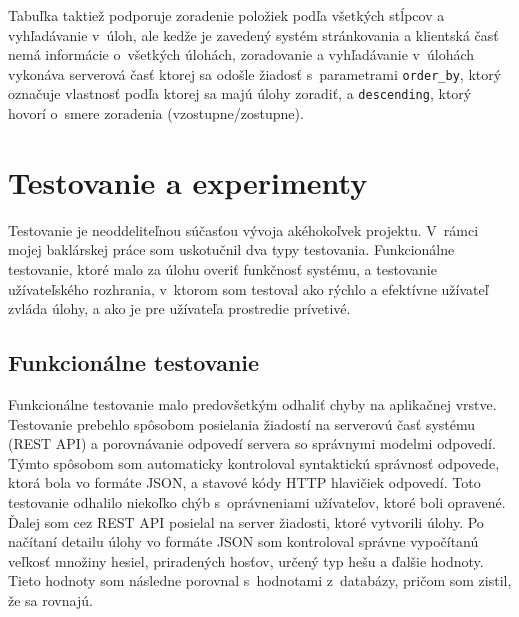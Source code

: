 \documentclass[slovak]{fitthesis}
\begin{document}
Tabuľka taktiež podporuje zoradenie položiek podľa všetkých stĺpcov a vyhľadávanie v~úloh, ale kedže je zavedený systém stránkovania a klientská časť nemá informácie o~všetkých úlohách, zoradovanie a vyhľadávanie v~úlohách vykonáva serverová časť ktorej sa odošle žiadosť s~parametrami \texttt{order\_by}, ktorý označuje vlastnosť podľa ktorej sa majú úlohy zoradiť, a \texttt{descending}, ktorý hovorí o~smere zoradenia (vzostupne/zostupne).



\chapter{Testovanie a experimenty}\label{testovanie}
Testovanie je neoddeliteľnou súčasťou vývoja akéhokoľvek projektu. V~rámci mojej baklárskej práce som uskotučnil dva typy testovania. Funkcionálne testovanie, ktoré malo za úlohu overiť funkčnosť systému, a testovanie užívateľského rozhrania, v~ktorom som testoval ako rýchlo a efektívne užívateľ zvláda úlohy, a ako je pre užívateľa  prostredie prívetivé.

\section{Funkcionálne testovanie}
Funkcionálne testovanie malo predovšetkým odhaliť chyby na aplikačnej vrstve. Testovanie prebehlo spôsobom posielania žiadostí na serverovú časť systému (REST API) a porovnávanie odpovedí servera so správnymi modelmi odpovedí. Týmto spôsobom som automaticky kontroloval syntaktickú správnosť odpovede, ktorá bola vo formáte JSON, a stavové kódy HTTP hlavičiek odpovedí. Toto testovanie odhalilo niekoľko chýb s~oprávneniami užívateľov, ktoré boli opravené. Ďalej som cez REST API posielal na server žiadosti, ktoré vytvorili úlohy. Po načítaní detailu úlohy vo formáte JSON som kontroloval správne vypočítanú veľkosť množiny hesiel, priradených hosťov, určený typ hešu a ďalšie hodnoty. Tieto hodnoty som následne porovnal s~hodnotami z~databázy, pričom som zistil, že sa rovnajú.
\end{document}
